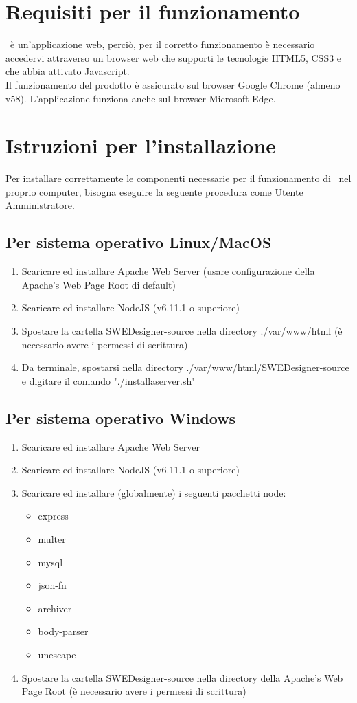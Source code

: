 \documentclass[../ManualeUtente.tex]{subfiles}
\begin{document}
	\section{Requisiti per il funzionamento}
		\progetto\ è un'applicazione web, perciò, per il corretto funzionamento
		è necessario accedervi attraverso un browser web che supporti le
		tecnologie HTML5, CSS3 e che abbia attivato Javascript.\\
		Il funzionamento del prodotto è assicurato sul browser Google Chrome (almeno v58).
		L'applicazione funziona anche sul browser Microsoft Edge.
	\section{Istruzioni per l'installazione}\label{sez:installIstr}
		Per installare correttamente le componenti necessarie per il funzionamento di \progetto\ nel proprio computer,
		bisogna eseguire la seguente procedura come Utente Amministratore.
		\subsection{Per sistema operativo Linux/MacOS}
			\begin{enumerate}
				\item Scaricare ed installare Apache Web Server (usare configurazione della
				Apache's Web Page Root di default)
				\item Scaricare ed installare NodeJS (v6.11.1 o superiore)
	 			\item Spostare la cartella SWEDesigner-source nella directory ./var/www/html
	 			(è necessario avere i permessi di scrittura)
	 			\item Da terminale, spostarsi nella directory ./var/www/html/SWEDesigner-source e digitare il comando
	 			"./installaserver.sh"
			\end{enumerate}
		\subsection{Per sistema operativo Windows}
			\begin{enumerate}
				\item Scaricare ed installare Apache Web Server
	 			\item Scaricare ed installare NodeJS (v6.11.1 o superiore)
 				\item Scaricare ed installare (globalmente) i seguenti pacchetti node:
 				\begin{itemize}
 					\item express
 					\item multer
 					\item mysql
 					\item json-fn
 					\item archiver
 					\item body-parser
 					\item unescape
 				\end{itemize}
 				\item Spostare la cartella SWEDesigner-source nella directory della Apache's Web Page Root
 				(è necessario avere i permessi di scrittura)
			\end{enumerate}
\end{document}
